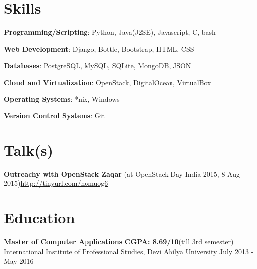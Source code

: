 \documentclass[margin,line]{resume}
\begin{document}
\begin{resume}
\begin{list2}
	\end{list2}

    \section{\mysidestyle Skills} 

    \begin{list2}
	\item \textbf{Programming/Scripting}: \hspace{3mm} Python, Java(J2SE), Javascript, C, bash
	\item \textbf{Web Development}: \hspace{13mm}  Django, Bottle, Bootstrap, HTML, CSS
	\item \textbf{Databases}: \hspace{28mm} PostgreSQL, MySQL, SQLite,	MongoDB, JSON
	\item \textbf{Cloud and Virtualization}: \hspace{1mm} OpenStack, DigitalOcean, VirtualBox
	\item \textbf{Operating Systems}: \hspace{12mm} *nix, Windows
    \item \textbf{Version Control Systems}: \hspace{2mm} Git
	\end{list2}

    \section{\mysidestyle Talk(s)}
    \begin{list2}
    \item \textbf{Outreachy with OpenStack Zaqar} (at OpenStack Day India 2015, 8-Aug 2015)\url{http://tinyurl.com/nomuog6}
    \end{list2}

    \section{\mysidestyle Education}

    \begin{list2}
	\item \textbf{Master of Computer Applications} \hspace{47mm} \textbf{CGPA: 8.69/10}(till 3rd semester) \\ International Institute of Professional Studies, Devi Ahilya University \hspace{17mm} July 2013 - May 2016
	\end{list2}


\end{resume}
\end{document}
